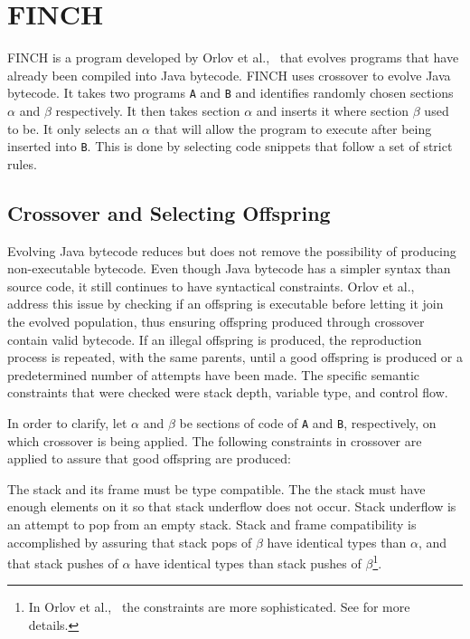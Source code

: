 \documentclass{sig-alternate}
\begin{document}
\section{FINCH}
FINCH is a program developed by Orlov et al.,~\cite{FINCH2:2009,FINCH:2011} that evolves programs that have already been compiled into Java bytecode. FINCH uses crossover to evolve Java bytecode. It takes two programs \texttt{A} and \texttt{B} and identifies randomly chosen sections $\alpha$ and $\beta$ respectively. It then takes section $\alpha$ and inserts it where section $\beta$ used to be. It only selects an $\alpha$ that will allow the program to execute after being inserted into \texttt{B}. This is done by selecting code snippets that follow a set of strict rules.

\subsection{Crossover and Selecting Offspring}
Evolving Java bytecode reduces but does not remove the possibility of producing non-executable bytecode. Even though Java bytecode has a simpler syntax than source code, it still continues to have syntactical constraints. Orlov et al.,~\cite{FINCH2:2009} address this issue by checking if an offspring is executable before letting it join the evolved population, thus ensuring offspring produced through crossover contain valid bytecode. If an illegal offspring is produced, the reproduction process is repeated, with the same parents, until a good offspring is produced or a predetermined number of attempts have been made. The specific semantic constraints that were checked were stack depth, variable type, and control flow.\par

In order to clarify, let $\alpha$ and $\beta$ be sections of code of \texttt{A} and \texttt{B}, respectively, on which crossover is being applied.
The following constraints in crossover are applied to assure that good offspring are produced:\par

The stack and its frame must be type compatible. The the stack must have enough elements on it so that stack underflow does not occur. Stack underflow is an attempt to pop from an empty stack. Stack and frame compatibility is accomplished by assuring that stack pops of $\beta$ have identical types than $\alpha$, and that stack pushes of $\alpha$ have identical types than stack pushes of $\beta$\footnote{In Orlov et al.,~\cite{FINCH2:2009} the constraints are more sophisticated. See \cite{FINCH2:2009} for more details.}. \par
\end{document}
